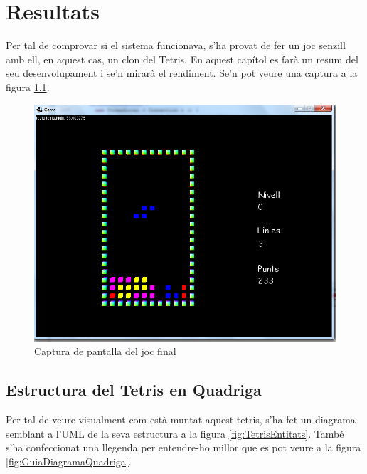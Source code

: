 \chapter{Resultats}

  Per tal de comprovar si el sistema funcionava, s'ha provat de fer un joc senzill amb ell, en aquest cas, un clon del Tetris. En aquest capítol es farà un resum del seu desenvolupament i se'n mirarà el rendiment. Se'n pot veure una captura a la figura \ref{fig:ImatgeTetris}.

  \begin{figure}
    \centering
    \includegraphics[width=0.5\linewidth]{./img/ImatgeTetris.png}
    \caption{Captura de pantalla del joc final \label{fig:ImatgeTetris}}
  \end{figure}

\section{Estructura del Tetris en Quadriga}

  Per tal de veure visualment com està muntat aquest tetris, s'ha fet un diagrama semblant a l'UML de la seva estructura a la figura \ref{fig:TetrisEntitats}. També s'ha confeccionat una llegenda per entendre-ho millor que es pot veure a la figura \ref{fig:GuiaDiagramaQuadriga}.

